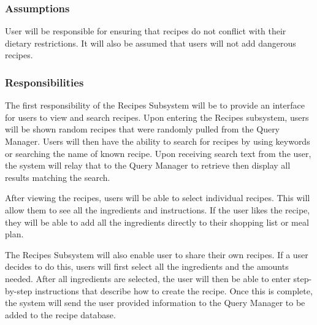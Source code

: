 \subsubsection{Assumptions}
User will be responsible for ensuring that recipes do not conflict with their dietary restrictions. It will also be assumed that users will not add dangerous recipes.

\subsubsection{Responsibilities}
The first responsibility of the Recipes Subsystem will be to provide an interface for users to view and search recipes. Upon entering the Recipes subsystem, users will be shown random recipes that were randomly pulled from the Query Manager. Users will then have the ability to search for recipes by using keywords or searching the name of known recipe. Upon receiving search text from the user, the system will relay that to the Query Manager to retrieve then display all results matching the search. 

After viewing the recipes, users will be able to select individual recipes. This will allow them to see all the ingredients and instructions. If the user likes the recipe, they will be able to add all the ingredients directly to their shopping list or meal plan.

The Recipes Subsystem will also enable user to share their own recipes. If a user decides to do this, users will first select all the ingredients and the amounts needed. After all ingredients are selected, the user will then be able to enter step-by-step instructions that describe how to create the recipe. Once this is complete, the system will send the user provided information to the Query Manager to be added to the recipe database.

